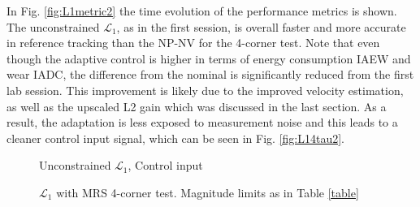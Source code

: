 In Fig. \ref{fig:L1metric2} the time evolution of the performance metrics is shown. The unconstrained $\mathcal{L}_1$, as in the first session, is overall faster and more accurate in reference tracking than the NP-NV for the 4-corner test. Note that even though the adaptive control is higher in terms of energy consumption IAEW and wear IADC, the difference from the nominal is significantly reduced from the first lab session. This improvement is likely due to the improved velocity estimation, as well as the upscaled L2 gain which was discussed in the last section. As a result, the adaptation is less exposed to measurement noise and this leads to a cleaner control input signal, which can be seen in Fig. \ref{fig:L14tau2}.

\begin{figure}[!h]
    \centering
    \caption{Unconstrained $\mathcal{L}_1$, Control input }
\end{figure}\label{fig:L14tau2}


\begin{figure}[!h]
    \centering
    \caption{$\mathcal{L}_1$ with MRS 4-corner test. Magnitude limits as in Table \ref{table} }
\end{figure}\label{fig:L1MRS4corner2}

